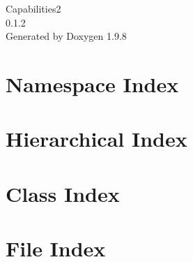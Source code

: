 \documentclass[twoside]{book}
\newcommand{\+}{\discretionary{\mbox{\scriptsize$\hookleftarrow$}}{}{}}
\newcommand{\clearemptydoublepage}{%
    \newpage{\pagestyle{empty}\cleardoublepage}%
  }
\begin{document}
  \raggedbottom
    \hypersetup{pageanchor=false,
                bookmarksnumbered=true,
                pdfencoding=unicode
               }
  \begin{titlepage}
  \vspace*{7cm}
  \begin{center}%
  {\Large Capabilities2}\\
  [1ex]\large 0.\+1.\+2 \\
  \vspace*{1cm}
  {\large Generated by Doxygen 1.9.8}\\
  \end{center}
  \end{titlepage}
  \clearemptydoublepage
  \tableofcontents
  \clearemptydoublepage
  \hypersetup{pageanchor=true}
























\chapter{Namespace Index}

\chapter{Hierarchical Index}

\chapter{Class Index}

\chapter{File Index}

\end{document}
